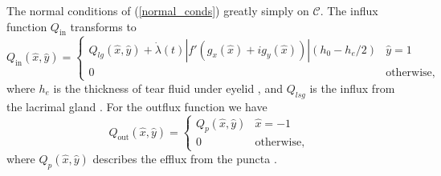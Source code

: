The normal conditions of (\ref{normal_conds}) greatly simply on $\mathcal{C}$. The influx function $Q_{\text{in}}$ transforms to
\begin{equation}
Q_{\text{in}}(\hat{x},\hat{y}) = \begin{cases}
Q_{lg}(\hat{x},\hat{y}) + \dot{\lambda}(t)|f'(g_x(\hat{x})+i g_y(\hat{x}))|(h_0-h_e/2) & \hat{y}=1 \\
0 & \text{otherwise},
\end{cases}
\end{equation}
where $h_e$ is the thickness of tear fluid under eyelid \cite{heryudono2007single}, and $Q_{lsg}$ is the influx from the lacrimal gland \cite{braun2015dynamics}. For the outflux function we have
\begin{equation}
Q_{\text{out}}(\hat{x},\hat{y}) = \begin{cases}
Q_{p}(\hat{x},\hat{y}) & \hat{x}=-1 \\
0 & \text{otherwise},
\end{cases}
\end{equation}
where $Q_{p}(\hat{x},\hat{y})$ describes the efflux from the puncta \cite{braun2015dynamics}.

